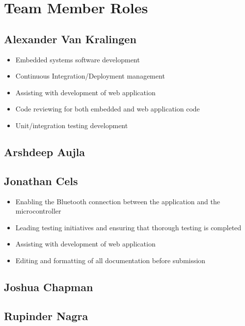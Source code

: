 \documentclass{article}
\begin{document}
\section{Team Member Roles}
\subsection{Alexander Van Kralingen}
\begin{itemize}
    \item Embedded systems software development
    \item Continuous Integration/Deployment management
    \item Assisting with development of web application
    \item Code reviewing for both embedded and web application code
    \item Unit/integration testing development
\end{itemize}

\subsection{Arshdeep Aujla}
{}

\subsection{Jonathan Cels}
\begin{itemize}
    \item Enabling the Bluetooth connection between the application and the microcontroller
    \item Leading testing initiatives and ensuring that thorough testing is completed
    \item Assisting with development of web application
    \item Editing and formatting of all documentation before submission
\end{itemize}

\subsection{Joshua Chapman}
{}

\subsection{Rupinder Nagra}
{}
\end{document}
